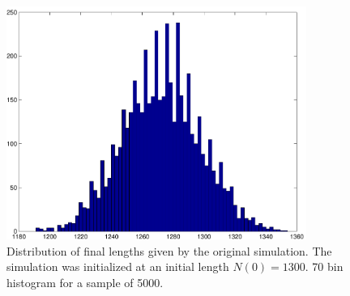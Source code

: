\documentclass[titlepage]{article}
\begin{document}



\begin{figure}%
\centering
\includegraphics[height=3in]{ic8_15Ks}
\caption{Distribution of final lengths given by the original simulation. The simulation was initialized at an initial length $N(0) = 1300$. 70 bin histogram for a sample of 5000.}
\label{fig:orig_ic8_15Ks}
\end{figure}
\end{document}
